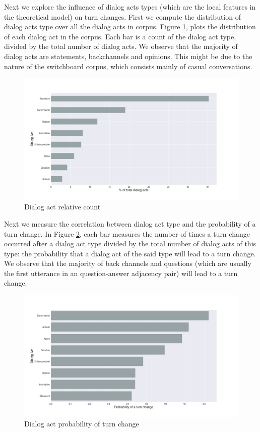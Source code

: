 Next we explore the influence of dialog acts types (which are the local features in the theoretical model) on turn changes.
First we compute the distribution of dialog acts type over all the dialog acts in corpus.
Figure \ref{fig:act}, plots the distribution of each dialog act in the corpus. Each bar is a count of the dialog act type, divided by the total number of dialog acts.  We observe that the majority of dialog acts are statements, backchannels and opinions. This might be due to the nature of the switchboard corpus, which consists mainly of casual conversations.
%
\begin{figure}[ht!]
 \centering
 \includegraphics[width=\textwidth]{../scikitlearn/figures/f1.png}\vspace{-0.5em}
 \caption{Dialog act relative count}
 \label{fig:act}
 \end{figure}

Next we measure the correlation between dialog act type and the probability of a turn change.  In Figure \ref{fig:act:turnchange}, each bar measures the number of times a turn change occurred after a dialog act type divided by the total number of dialog acts of this type: the probability that a dialog act of the said type will lead to a turn change. We observe that the majority of back channels and questions (which are usually the first utterance in an question-answer adjacency pair) will lead to a turn change.
%
\begin{figure}[ht!]
\centering
\includegraphics[width=\textwidth]{../scikitlearn/figures/f2.png}\vspace{-0.5em}
\caption{Dialog act probability of turn change}
\label{fig:act:turnchange}
\end{figure}

